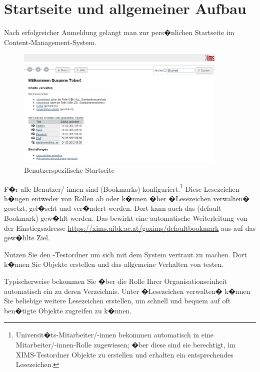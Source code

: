 \section{Startseite und allgemeiner Aufbau}
\label{startseite}

Nach erfolgreicher Anmeldung gelangt man zur pers�nlichen Startseite
im  Content-Management-System.

\begin{figure}[!ht]
  \centering
  \includegraphics[width=0.90\textwidth]{./images/ximsstartseite.png}
  \caption{Benutzerspezifische  Startseite}
  \label{fig:ximsstartseite2}
\end{figure}

F�r alle Benutzer/-innen sind  (Bookmarks)
konfiguriert.\footnote{Universit�ts-Mitarbeiter/-innen bekommen
  automatisch in eine Mitarbeiter/-innen-Rolle zugewiesen; �ber diese
  sind sie berechtigt, im {XIMS}-Testordner Objekte zu erstellen und
  erhalten ein entsprechendes Lesezeichen.} Diese Lesezeichen h�ngen
entweder von Rollen ab oder k�nnen �ber �Lesezeichen verwalten� gesetzt, gel�scht und ver�ndert werden. Dort kann auch das
 (default Bookmark) gew�hlt werden.
Das  bewirkt eine automatische
Weiterleitung von der Einstiegsadresse
\url{https://xims.uibk.ac.at/goxims/defaultbookmark} aus auf das
gew�hlte Ziel.



\begin{Hinweis}
  Nutzen Sie den -Testordner um sich mit dem System
  vertraut zu machen. Dort k�nnen Sie Objekte erstellen und das
  allgemeine Verhalten von  testen.
\end{Hinweis}

Typischerweise bekommen Sie �ber die Rolle Ihrer Organisationseinheit
automatisch ein  zu deren Verzeichnis. Unter �Lesezeichen
verwalten� k�nnen Sie beliebige weitere Lesezeichen erstellen, um
schnell und bequem auf oft ben�tigte Objekte zugreifen zu k�nnen.

